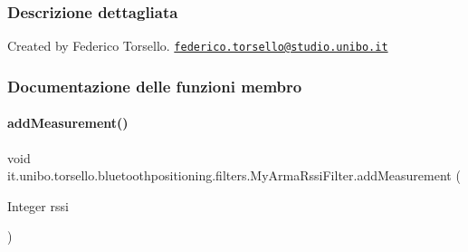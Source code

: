 \subsubsection{Descrizione dettagliata}
Created by Federico Torsello. \href{mailto:federico.torsello@studio.unibo.it}{\tt federico.\+torsello@studio.\+unibo.\+it} 

\subsubsection{Documentazione delle funzioni membro}
\hypertarget{classit_1_1unibo_1_1torsello_1_1bluetoothpositioning_1_1filters_1_1MyArmaRssiFilter_afdb5386fe2b25ac048a992fb70de2f65_afdb5386fe2b25ac048a992fb70de2f65}{}\label{classit_1_1unibo_1_1torsello_1_1bluetoothpositioning_1_1filters_1_1MyArmaRssiFilter_afdb5386fe2b25ac048a992fb70de2f65_afdb5386fe2b25ac048a992fb70de2f65} 
\paragraph{\texorpdfstring{add\+Measurement()}{addMeasurement()}}
{\footnotesize\ttfamily void it.\+unibo.\+torsello.\+bluetoothpositioning.\+filters.\+My\+Arma\+Rssi\+Filter.\+add\+Measurement (\begin{DoxyParamCaption}\item[{Integer}]{rssi }\end{DoxyParamCaption})}


